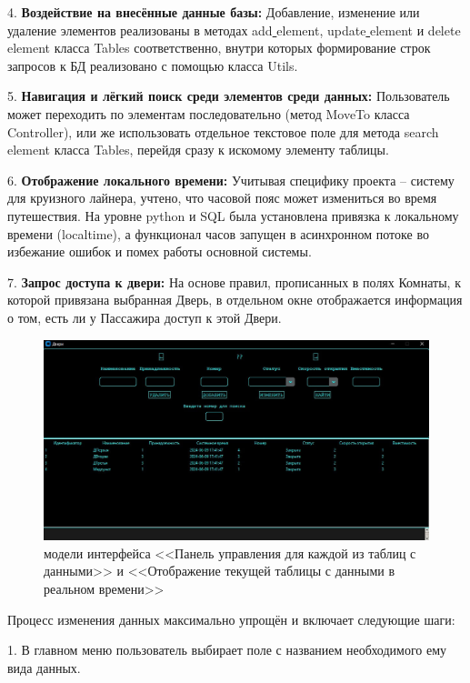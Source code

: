 4. \textbf{Воздействие на внесённые данные базы:} Добавление, изменение или удаление элементов реализованы в методах add\underline{ }element, update\underline{ }element и delete\underline{ }element класса Tables соответственно, внутри которых формирование строк запросов к БД реализовано с помощью класса Utils.

5. \textbf{Навигация и лёгкий поиск среди элементов среди данных:} Пользователь может переходить по элементам последовательно (метод MoveTo класса Controller), или же использовать отдельное текстовое поле для метода search\underline{ }element класса Tables, перейдя сразу к искомому элементу таблицы.

6. \textbf{Отображение локального времени:} Учитывая специфику проекта -- систему для круизного лайнера, учтено, что часовой пояс может измениться во время путешествия. На уровне python и SQL была установлена привязка к локальному времени (localtime), а функционал часов запущен в асинхронном потоке во избежание ошибок и помех работы основной системы.

7. \textbf{Запрос доступа к двери:} На основе правил, прописанных в полях Комнаты, к которой привязана выбранная Дверь, в отдельном окне отображается информация о том, есть ли у Пассажира доступ к этой Двери.

\begin{figure} [ht]
	\centering
	\includegraphics[width=1\linewidth]{images/Example2}
	\caption{модели интерфейса <<Панель управления для каждой из таблиц с данными>> и <<Отображение текущей таблицы с данными в реальном времени>>}
	\label{fig:example2}
\end{figure}

Процесс изменения данных максимально упрощён и включает следующие шаги:

1. В главном меню пользователь выбирает поле с названием необходимого ему вида данных.

